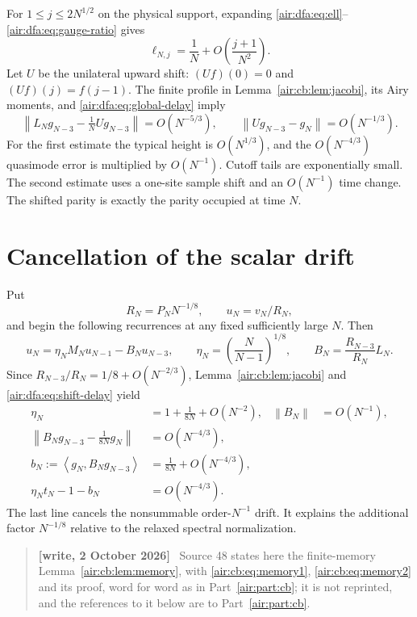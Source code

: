 \documentclass[11pt,letterpaper]{article}
\numberwithin{equation}{section}
\theoremstyle{remark}
\newcommand{\norm}[1]{\left\lVert#1\right\rVert}
\newcommand{\ip}[2]{\left\langle#1,#2\right\rangle}
\newenvironment{writenote}{\par\smallskip\begin{quote}\small\textbf{[write, 2 October 2026]}\ }{\end{quote}\smallskip}
\begin{document}
For $1\le j\le2N^{1/2}$ on the physical support, expanding \eqref{air:dfa:eq:ell}--\eqref{air:dfa:eq:gauge-ratio} gives
\[
\ell_{N,j}=\frac1N+O\!\left(\frac{j+1}{N^2}\right).
\]
Let $U$ be the unilateral upward shift: $(Uf)(0)=0$ and $(Uf)(j)=f(j-1)$.
The finite profile in Lemma~\ref{air:cb:lem:jacobi}, its Airy moments, and
\eqref{air:dfa:eq:global-delay} imply
\begin{equation}\label{air:dfa:eq:shift-delay}
\norm{L_Ng_{N-3}-\tfrac1N Ug_{N-3}}=O(N^{-5/3}),\qquad
\norm{Ug_{N-3}-g_N}=O(N^{-1/3}).
\end{equation}
For the first estimate the typical height is $O(N^{1/3})$, and the
$O(N^{-4/3})$ quasimode error is multiplied by $O(N^{-1})$. Cutoff tails
are exponentially small. The second estimate uses a one-site sample shift
and an $O(N^{-1})$ time change. The shifted parity is exactly the parity
occupied at time $N$.

\section{Cancellation of the scalar drift}\label{air:dfa:sec:drift}

Put
\begin{equation}\label{air:dfa:eq:renormalize}
R_N=P_NN^{-1/8},\qquad u_N=v_N/R_N,
\end{equation}
and begin the following recurrences at any fixed sufficiently large $N$.
Then
\begin{equation}\label{air:dfa:eq:normalized-delay}
u_N=\eta_NM_Nu_{N-1}-B_Nu_{N-3},\qquad
\eta_N=\left(\frac N{N-1}\right)^{1/8},\qquad
B_N=\frac{R_{N-3}}{R_N}L_N.
\end{equation}
Since $R_{N-3}/R_N=1/8+O(N^{-2/3})$, Lemma~\ref{air:cb:lem:jacobi} and
\eqref{air:dfa:eq:shift-delay} yield
\begin{equation}\label{air:dfa:eq:drift}
\begin{aligned}
\eta_N&=1+\frac1{8N}+O(N^{-2}),& \norm{B_N}&=O(N^{-1}),\\
\norm{B_Ng_{N-3}-\tfrac1{8N}g_N}&=O(N^{-4/3}),\\
b_N:=\ip{g_N}{B_Ng_{N-3}}&=\frac1{8N}+O(N^{-4/3}),\\
\eta_Nt_N-1-b_N&=O(N^{-4/3}).
\end{aligned}
\end{equation}
The last line cancels the nonsummable order-$N^{-1}$ drift. It explains the
additional factor $N^{-1/8}$ relative to the relaxed spectral normalization.

\begin{writenote}
Source 48 states here the finite-memory Lemma~\ref{air:cb:lem:memory}, with \eqref{air:cb:eq:memory1}, \eqref{air:cb:eq:memory2} and its proof, word for word as in Part~\ref{air:part:cb}; it is not reprinted, and the references to it below are to Part~\ref{air:part:cb}.
\end{writenote}
\end{document}
